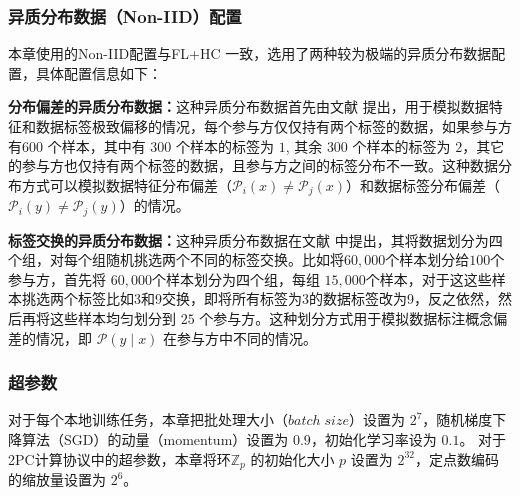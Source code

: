\subsubsection{异质分布数据（Non-IID）配置}
本章使用的Non-IID配置与FL+HC \cite{briggs2020federated} 一致，选用了两种较为极端的异质分布数据配置，具体配置信息如下：
\begin{compactenum}
	\item \textbf{分布偏差的异质分布数据：}这种异质分布数据首先由文献 \cite{mcmahan2017communication} 提出，用于模拟数据特征和数据标签极致偏移的情况，每个参与方仅仅持有两个标签的数据，如果参与方有$600$ 个样本，其中有 $300$ 个样本的标签为 $1$, 其余 $300$ 个样本的标签为 $2$，其它的参与方也仅持有两个标签的数据，且参与方之间的标签分布不一致。这种数据分布方式可以模拟数据特征分布偏差（$\mathcal{P}_i(x) \neq \mathcal{P}_j(x)$）和数据标签分布偏差（$\mathcal{P}_i(y) \neq \mathcal{P}_j(y)$）的情况。
	\item \textbf{标签交换的异质分布数据：}这种异质分布数据在文献 \cite{sattler2020clustered} 中提出，其将数据划分为四个组，对每个组随机挑选两个不同的标签交换。比如将$60,000$个样本划分给$100$个参与方，首先将 $60,000$个样本划分为四个组，每组 $15,000$个样本，对于这这些样本挑选两个标签比如3和9交换，即将所有标签为3的数据标签改为9，反之依然，然后再将这些样本均匀划分到 $25$ 个参与方。这种划分方式用于模拟数据标注概念偏差的情况，即 $\mathcal{P}(y \mid x)$ 在参与方中不同的情况。
\end{compactenum}

\subsubsection{超参数}
对于每个本地训练任务，本章把批处理大小（$batch\;size$）设置为 $2^7$，随机梯度下降算法（SGD）的动量（momentum）设置为 $0.9$，初始化学习率设为 $0.1$。
对于2PC计算协议中的超参数，本章将环$\mathbb{Z}_p$ 的初始化大小 $p$ 设置为 $2^{32}$，定点数编码的缩放量设置为 $2^6$。

